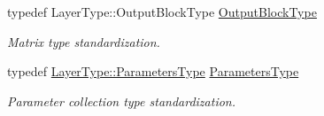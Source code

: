 \begin{DoxyCompactItemize}
typedef Layer\-Type\-::\-Output\-Block\-Type \hyperlink{classffnn_1_1optimizer_1_1_gradient_descent_3_01layer_1_1_convolution_3_01_t_a_r_g_s_01_4_01_4_a24c60e1a115ce2e27567a5b068eaf0a8}{Output\-Block\-Type}
\begin{DoxyCompactList}\small\item\em Matrix type standardization. \end{DoxyCompactList}\item 
typedef \hyperlink{classffnn_1_1layer_1_1_convolution_af2568040fc4089f93a6483da08dcc266}{Layer\-Type\-::\-Parameters\-Type} \hyperlink{classffnn_1_1optimizer_1_1_gradient_descent_3_01layer_1_1_convolution_3_01_t_a_r_g_s_01_4_01_4_a0bbe4560ab81eacf8e75ac5510ad696e}{Parameters\-Type}
\begin{DoxyCompactList}\small\item\em Parameter collection type standardization. \end{DoxyCompactList}\end{DoxyCompactItemize}
